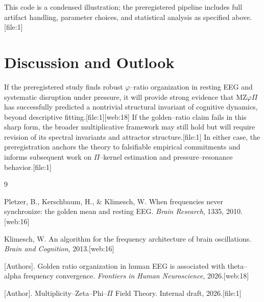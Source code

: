 \documentclass[11pt]{article}
\begin{document}
This code is a condensed illustration; the preregistered pipeline includes full artifact handling, parameter choices, and statistical analysis as specified above.[file:1]

\section{Discussion and Outlook}

If the preregistered study finds robust $\varphi$--ratio organization in resting EEG and systematic disruption under pressure, it will provide strong evidence that MZ$\varphi\Pi$ has successfully predicted a nontrivial structural invariant of cognitive dynamics, beyond descriptive fitting.[file:1][web:18]
If the golden--ratio claim fails in this sharp form, the broader multiplicative framework may still hold but will require revision of its spectral invariants and attractor structure.[file:1]
In either case, the preregistration anchors the theory to falsifiable empirical commitments and informs subsequent work on $\Pi$--kernel estimation and pressure--resonance behavior.[file:1]


\begin{thebibliography}{9}

Pletzer, B., Kerschbaum, H., \& Klimesch, W.
\newblock When frequencies never synchronize: the golden mean and resting EEG.
\newblock \emph{Brain Research}, 1335, 2010.[web:16]

Klimesch, W.
\newblock An algorithm for the frequency architecture of brain oscillations.
\newblock \emph{Brain and Cognition}, 2013.[web:16]

[Authors].
\newblock Golden ratio organization in human EEG is associated with theta--alpha
frequency convergence.
\newblock \emph{Frontiers in Human Neuroscience}, 2026.[web:18]

[Author].
\newblock Multiplicity--Zeta--Phi--$\Pi$ Field Theory.
\newblock Internal draft, 2026.[file:1]

\end{thebibliography}
\end{document}
